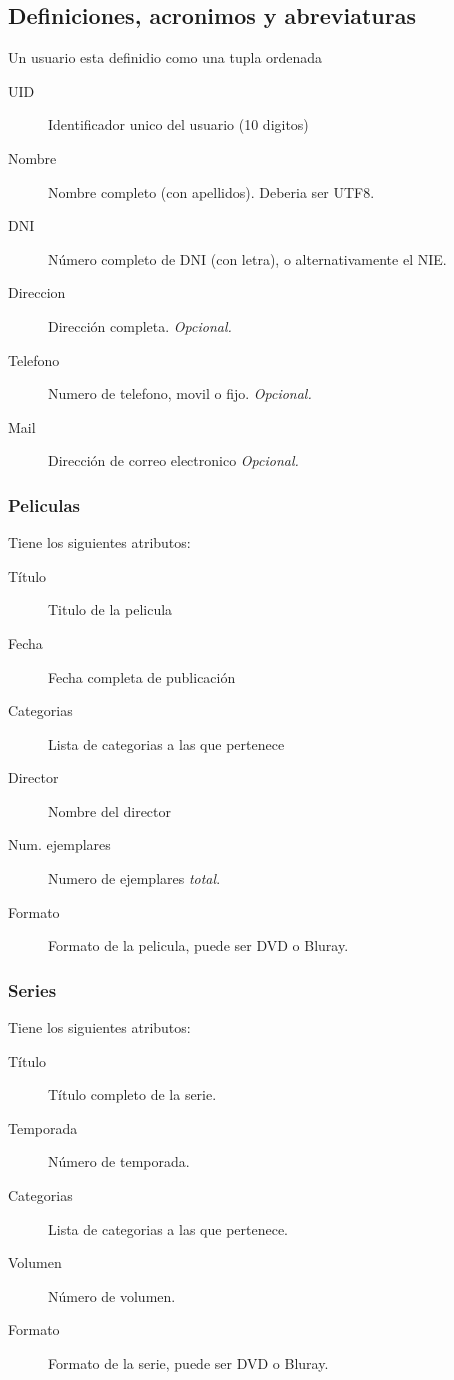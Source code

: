 \documentclass[11pt]{article}
\begin{document}
\subsection{Definiciones, acronimos y abreviaturas}
Un usuario esta definidio como una tupla ordenada
\begin{description}
	\item[UID]      		Identificador unico del usuario (10 digitos)
	\item[Nombre]   		Nombre completo (con apellidos). Deberia ser UTF8.
	\item[DNI]      		Número completo de DNI (con letra), o alternativamente el NIE.
	\item[Direccion]	Dirección completa. \textit{Opcional.}
	\item[Telefono] 		Numero de telefono, movil o fijo. \textit{Opcional.}
	\item[Mail]     		Dirección de correo electronico \textit{Opcional.}
\end{description}

\subsubsection{Peliculas}
Tiene los siguientes atributos:
\begin{description}
	\item[Título] Titulo de la pelicula
	\item[Fecha] Fecha completa de publicación 
	\item[Categorias] Lista de categorias a las que pertenece
	\item[Director] Nombre del director
	\item[Num. ejemplares] Numero de ejemplares \emph{total}.
	\item[Formato] Formato de la pelicula, puede ser DVD o Bluray.
\end{description}

\subsubsection{Series}
Tiene los siguientes atributos:
\begin{description}
	\item[Título] Título completo de la serie.
	\item[Temporada] Número de temporada.
	\item[Categorias] Lista de categorias a las que pertenece.
	\item[Volumen] Número de volumen. 
	\item[Formato] Formato de la serie, puede ser DVD o Bluray.
\end{description}
\end{document}
